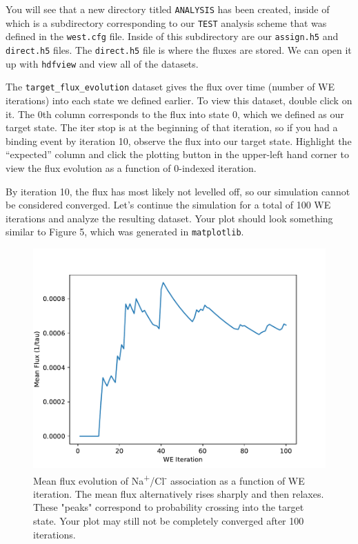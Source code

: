 \documentclass[9pt,tutorial]{livecoms}
\begin{document}
You will see that a new directory titled \verb|ANALYSIS| has been created, inside of which is a subdirectory corresponding to our \verb|TEST| analysis scheme that was defined in the \verb|west.cfg| file. 
Inside of this subdirectory are our \verb|assign.h5| and \verb|direct.h5| files. 
The \verb|direct.h5| file is where the fluxes are stored. 
We can open it up with \verb|hdfview| and view all of the datasets.
 
The \verb|target_flux_evolution| dataset gives the flux over time (number of WE iterations) into each state we defined earlier. 
To view this dataset, double click on it. 
The 0th column corresponds to the flux into state 0, which we defined as our target state. 
The iter stop is at the beginning of that iteration, so if you had a binding event by iteration 10, observe the  flux into our target state. 
Highlight the “expected” column and click the plotting button in the upper-left hand corner to view the flux evolution as a function of 0-indexed iteration.
 
By iteration 10, the flux has most likely not levelled off, so our simulation cannot be considered converged. 
Let’s continue the simulation for a total of 100 WE iterations and analyze the resulting dataset. 
Your plot should look something similar to Figure 5, which was generated in \verb|matplotlib|. 

\begin{figure}
\includegraphics[width=\linewidth]{Figure5.pdf}
\caption{Mean flux evolution of Na\textsuperscript{+}/Cl\textsuperscript{-} association as a function of WE iteration. 
The mean flux alternatively rises sharply and then relaxes. 
These "peaks" correspond to probability crossing into the target state. 
Your plot may still not be completely converged after 100 iterations.}
\label{fig:view}
\end{figure}
\end{document}
